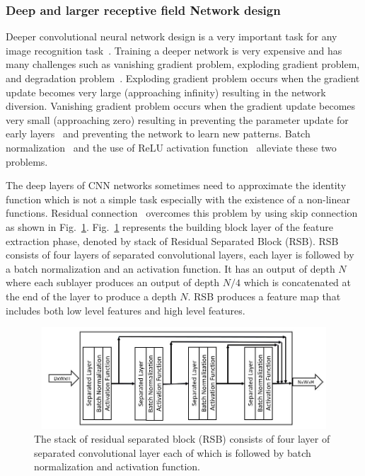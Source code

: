 \subsubsection{ Deep and larger receptive field Network design}

Deeper convolutional neural network design is a very important task for any image recognition task~\cite{he2016deep}. Training a deeper network is very expensive and has many challenges such as vanishing gradient problem, exploding gradient problem, and degradation problem~\cite{he2016deep}. Exploding gradient problem occurs  when the  gradient update becomes very large (approaching infinity) resulting in the network diversion. Vanishing gradient problem occurs when the  gradient update becomes very small (approaching zero) resulting in preventing the parameter update for early layers~\cite{ioffe2015batch} and preventing the network to learn new patterns. Batch normalization~\cite{ioffe2015batch} and the use of ReLU activation function~\cite{krizhevsky2012imagenet} alleviate these two problems.

The deep layers of CNN networks sometimes need to  approximate the identity function which is not a simple task especially  with the existence of a non-linear functions. Residual connection~\cite{he2016deep} overcomes this problem by using skip connection as shown in Fig.~\ref{fig4}.
Fig.~\ref{fig4} represents the building block layer of the feature extraction phase, denoted by stack of Residual Separated Block  (RSB). RSB consists of four layers of separated convolutional layers, each layer is followed by a batch normalization and an activation function. It has an output of depth $N$ where each sublayer produces an output of depth $N/4$ which is concatenated at the end of the layer to produce a depth  $N$. RSB produces a feature map that includes both low level features and high level features.

\begin{figure}
\begin{center}
\includegraphics[height=38mm,width=14.0cm]{Figures/fig4.jpg}
\caption{The stack of residual separated block  (RSB) consists of four layer of separated convolutional layer each of which is followed by batch normalization and activation function.}
\label{fig4}
\end{center}
\end{figure}

